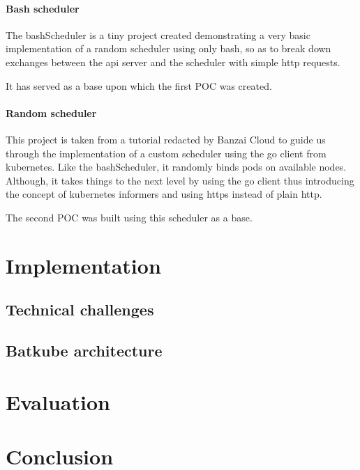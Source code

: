 \documentclass[12pt]{report}
\begin{document}
\subsubsection{Bash scheduler}

The bashScheduler\cite{bashScheduler} is a tiny project created demonstrating a
very basic implementation of a random scheduler using only bash, so as to break
down exchanges between the api server and the scheduler with simple http
requests.

It has served as a base upon which the first POC was created.

\subsubsection{Random scheduler}

This project is taken from a tutorial\cite{banzai-tuto} redacted by Banzai
Cloud to guide us through the implementation of a custom scheduler using the go
client\cite{client-go} from kubernetes.
Like the bashScheduler, it randomly binds pods on available nodes. Although, it
takes things to the next level by using the go client thus introducing the
concept of kubernetes informers and using https instead of plain http.

The second POC was built using this scheduler as a base.

\chapter{Implementation}

\section{Technical challenges}

\section{Batkube architecture}


\chapter{Evaluation}

\chapter{Conclusion}


\printbibliography
\end{document}
